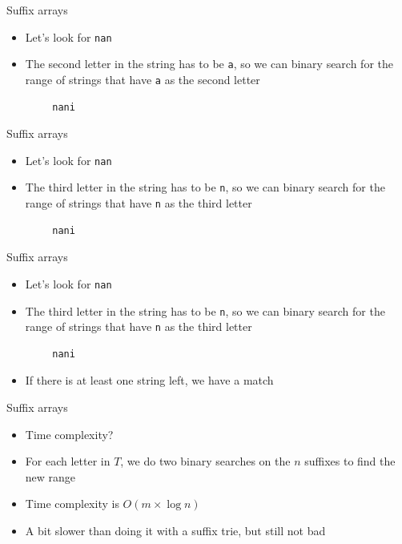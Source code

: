 \documentclass{beamer}
\begin{document}
\begin{frame}[fragile]{Suffix arrays}
	\begin{itemize}
		\item Let's look for \texttt{nan}
		\item The second letter in the string has to be \texttt{a}, so we can binary search for the range of strings that have \texttt{a} as the second letter
	\end{itemize}
	\vspace{10pt}
	\begin{verbatim}
		nani
	\end{verbatim}
\end{frame}

\begin{frame}[fragile]{Suffix arrays}
	\begin{itemize}
		\item Let's look for \texttt{nan}
		\item The third letter in the string has to be \texttt{n}, so we can binary search for the range of strings that have \texttt{n} as the third letter
	\end{itemize}
	\vspace{10pt}
	\begin{verbatim}
		nani
	\end{verbatim}
\end{frame}

\begin{frame}[fragile]{Suffix arrays}
	\begin{itemize}
		\item Let's look for \texttt{nan}
		\item The third letter in the string has to be \texttt{n}, so we can binary search for the range of strings that have \texttt{n} as the third letter
	\end{itemize}
	\vspace{10pt}
	\begin{verbatim}
		nani
	\end{verbatim}
	\begin{itemize}
		\item<2-> If there is at least one string left, we have a match
	\end{itemize}
\end{frame}

\begin{frame}{Suffix arrays}
	\begin{itemize}
		\item Time complexity?
		\vspace{5pt}
		\item For each letter in $T$, we do two binary searches on the $n$ suffixes to find the new range
		\item Time complexity is $O(m \times \log n)$
		\vspace{10pt}
		\item A bit slower than doing it with a suffix trie, but still not bad
	\end{itemize}
\end{frame}
\end{document}
